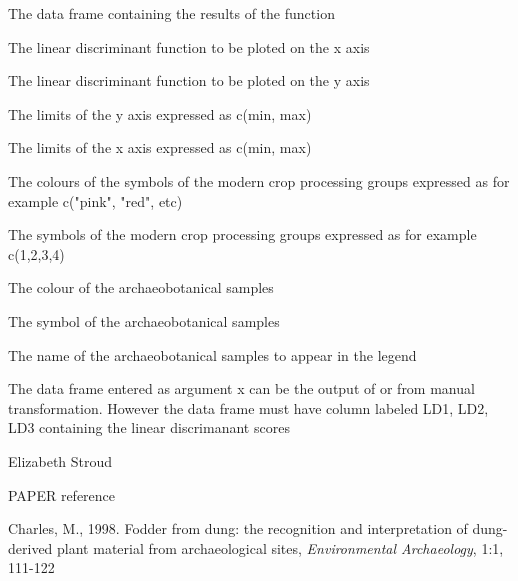 \documentclass[a4paper]{book}
\begin{document}
\begin{Arguments}
\begin{ldescription}
\item[\code{data}] The data frame containing the results of the  function

\item[\code{Func1}] The linear discriminant function to be ploted on the x axis

\item[\code{Func2}] The linear discriminant function to be ploted  on the y axis

\item[\code{ylims}] The limits of the y axis expressed as c(min, max)

\item[\code{xlims}] The limits of the x axis expressed as c(min, max)

\item[\code{gcols}] The colours of the symbols of the modern crop processing groups expressed as for example c("pink", "red", etc)

\item[\code{gpchs}] The symbols of the modern crop processing groups  expressed as for example c(1,2,3,4)

\item[\code{col}] The colour of the archaeobotanical samples


\item[\code{pch}] The symbol of the archaeobotanical samples


\item[\code{site}] The name of the archaeobotanical samples to appear in the legend


\end{ldescription}
\end{Arguments}
%
\begin{Details}\relax
The data frame entered as argument x can be the output of  or from manual transformation. However the data frame must have column labeled LD1, LD2, LD3 containing the linear discrimanant scores
\end{Details}
%
\begin{Author}\relax
Elizabeth Stroud

\end{Author}
%
\begin{References}\relax
 PAPER reference

Charles, M., 1998. Fodder from dung: the recognition and interpretation of dung-derived plant material from archaeological sites, \emph{Environmental Archaeology}, 1:1, 111-122

\end{References}
\end{document}
